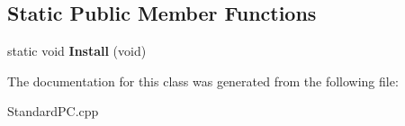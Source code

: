 \subsection*{Static Public Member Functions}
\begin{DoxyCompactItemize}
\item 
\mbox{\label{class_standard_p_c___internal_1_1_factory_aee622428354b75acb132461d7016758d}} 
static void {\bfseries Install} (void)
\end{DoxyCompactItemize}


The documentation for this class was generated from the following file\+:\begin{DoxyCompactItemize}
\item 
Standard\+P\+C.\+cpp\end{DoxyCompactItemize}
